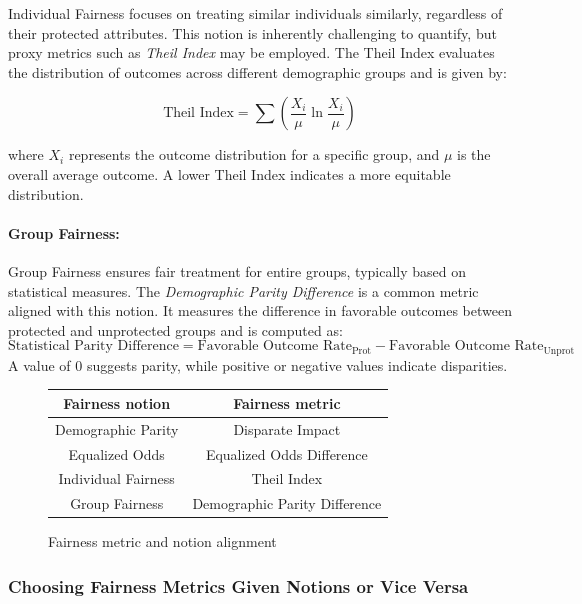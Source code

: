 Individual Fairness focuses on treating similar individuals similarly, regardless of their protected attributes. This notion is inherently challenging to quantify, but proxy metrics such as \emph{Theil Index} may be employed. The Theil Index evaluates the distribution of outcomes across different demographic groups and is given by:

\[
\text{Theil Index} = \sum \left( \frac{X_{i}}{\mu} \ln \frac{X_{i}}{\mu} \right)
\]

where \(X_{i}\) represents the outcome distribution for a specific group, and \(\mu\) is the overall average outcome. A lower Theil Index indicates a more equitable distribution.

\paragraph{Group Fairness:}

Group Fairness ensures fair treatment for entire groups, typically based on statistical measures. The \emph{Demographic Parity Difference} is a common metric aligned with this notion. It measures the difference in favorable outcomes between protected and unprotected groups and is computed as:
\[
\text{Statistical Parity Difference} = \text{Favorable Outcome Rate}_{\text{Prot}} - \text{Favorable Outcome Rate}_{\text{Unprot}}
\]
A value of 0 suggests parity, while positive or negative values indicate disparities.

\begin{figure}[H]
    \centering
    \begin{tabular}{|c|c|}
        \hline
        \textbf{Fairness notion} & \textbf{Fairness metric} \\
        \hline
        Demographic Parity & Disparate Impact \\
        \hline
        Equalized Odds & Equalized Odds Difference \\
        \hline
        Individual Fairness & Theil Index \\
        \hline
        Group Fairness & Demographic Parity Difference \\
        \hline
    \end{tabular}
    \caption{Fairness metric and notion alignment}
    \label{fig:alignment}
\end{figure}

\subsubsection{Choosing Fairness Metrics Given Notions or Vice Versa}

